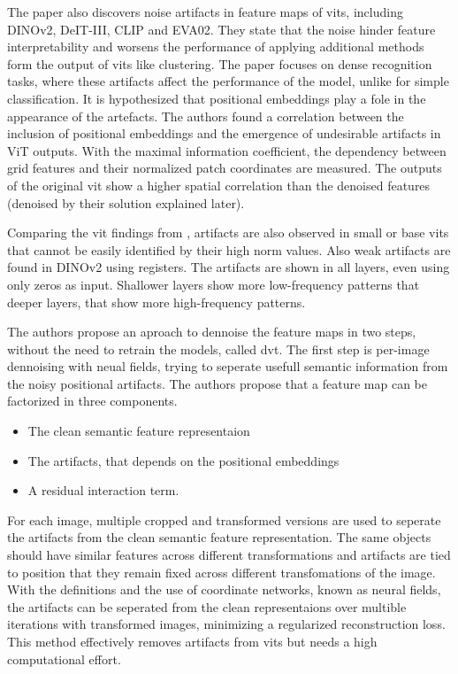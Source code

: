 \documentclass[conference]{IEEEtran}
\begin{document}
  The paper also discovers noise artifacts in feature maps of \acp{vit}, including \mbox{DINOv2}, DeIT-III, CLIP and EVA02. They state that the noise hinder feature interpretability and worsens the performance of applying additional methods form the output of \acp{vit} like clustering. The paper focuses on dense recognition tasks, where these artifacts affect the performance of the model, unlike for simple classification. It is hypothesized that positional embeddings play a fole in the appearance of the artefacts. The authors found a correlation between the inclusion of positional embeddings and the emergence of undesirable artifacts in ViT outputs. With the maximal information coefficient, the dependency between grid features and their normalized patch coordinates are measured. The outputs of the original \ac{vit} show a higher spatial correlation than the denoised features (denoised by their solution explained later).
  
  Comparing the \ac{vit} findings from \cite{registers}, artifacts are also observed in small or base \acp{vit} that cannot be easily identified by their high norm values. Also weak artifacts are found in \mbox{DINOv2} using registers. The artifacts are shown in all layers, even using only zeros as input. Shallower layers show more low-frequency patterns that deeper layers, that show more high-frequency patterns.

  The authors propose an aproach to dennoise the feature maps in two steps, without the need to retrain the models, called \acf{dvt}. The first step is per-image dennoising with neual fields, trying to seperate usefull semantic information from the noisy positional artifacts. The authors propose that a feature map can be factorized in three components.
  \begin{itemize}
    \item The clean semantic feature representaion
    \item The artifacts, that depends on the positional embeddings
    \item A residual interaction term.
  \end{itemize}

  For each image, multiple cropped and transformed versions are used to seperate the artifacts from the clean semantic feature representation. The same objects should have similar features across different transformations and artifacts are tied to position that they remain fixed across different transfomations of the image. With the definitions and the use of coordinate networks, known as neural fields, the artifacts can be seperated from the clean representaions over multible iterations with transformed images, minimizing a regularized reconstruction loss. This method effectively removes artifacts from \acp{vit} but needs a high computational effort.
\end{document}
